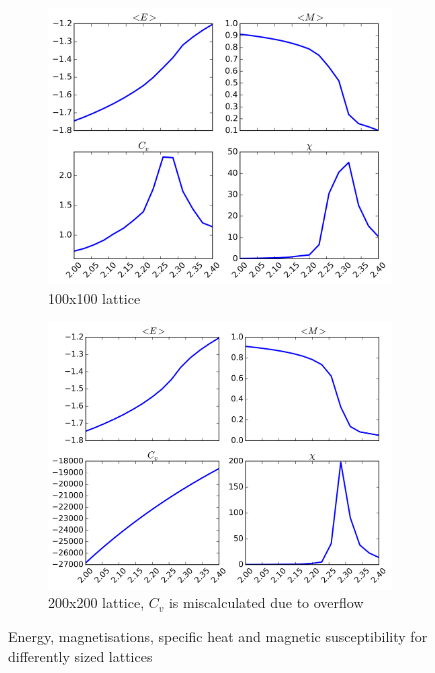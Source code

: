 \documentclass[11pt,a4paper,final]{article}
\numberwithin{equation}{section}
\begin{document}
\begin{figure}
\begin{subfigure}{0.49\textwidth}
\centering
\includegraphics[width=\textwidth]{pics/e100.png}
\caption{100x100 lattice}
\label{fig:e100}
\end{subfigure}
%
\begin{subfigure}{0.49\textwidth}
\centering
\includegraphics[width=\textwidth]{pics/e200.png}
\caption{200x200 lattice, $C_v$ is miscalculated due to overflow}
\label{fig:e200}
\end{subfigure}

\caption{Energy, magnetisations, specific heat and magnetic 
susceptibility for differently sized lattices}
\label{fig:EM}
\end{figure}
\end{document}
